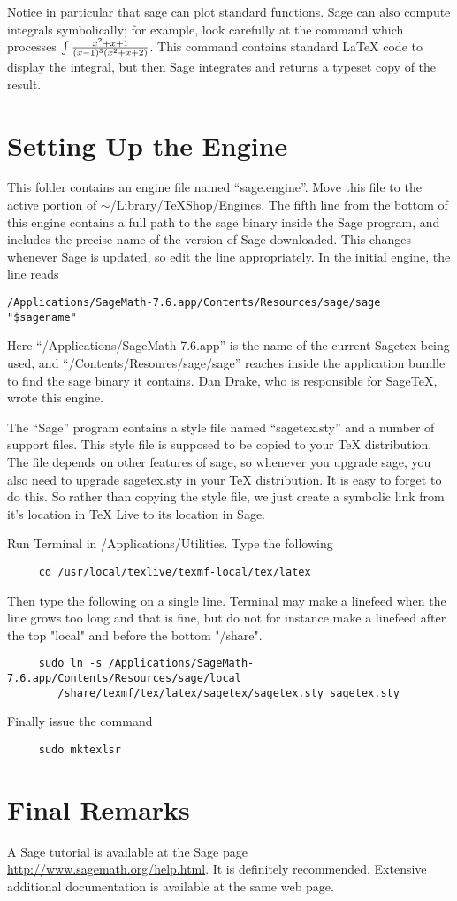 \documentclass[11pt, oneside]{amsart}
\begin{document}
Notice in particular that sage can plot standard functions. Sage can also compute integrals symbolically; for example, look carefully at the command which processes $\int {{x^2 + x + 1} \over {(x - 1)^3 (x^2 + x + 2)}}$. This command contains standard LaTeX code to display the integral, but then Sage integrates and returns a typeset copy of the result.


\section{Setting Up the Engine}

This folder contains an engine file named ``sage.engine''. Move this file to the active portion of $\sim$/Library/TeXShop/Engines.
 The fifth line from the bottom of this engine contains a full path to the sage binary inside the Sage program, and includes the precise name of the version of Sage downloaded. This changes whenever Sage is updated, so edit the line appropriately. In the initial engine, the line reads
\begin{verbatim}
/Applications/SageMath-7.6.app/Contents/Resources/sage/sage "$sagename"
\end{verbatim}
Here ``/Applications/SageMath-7.6.app'' is the name of the current Sagetex being
used, and ``/Contents/Resoures/sage/sage'' reaches inside the application bundle to find the
sage binary it contains.
Dan Drake, who is responsible for SageTeX, wrote this engine.

The ``Sage'' program contains a style file named ``sagetex.sty'' and a number of support files. This style file is supposed to be copied to your TeX distribution. The file depends on other features of sage, so whenever you upgrade sage, you also need to upgrade sagetex.sty in your TeX distribution. It is easy to forget to do this. So rather than copying the style file, we just
create a symbolic link from it's location in TeX Live to its location in Sage.

Run Terminal in /Applications/Utilities. Type the following
\begin{verbatim}
     cd /usr/local/texlive/texmf-local/tex/latex
\end{verbatim}
Then type the following on a single line. Terminal may make a linefeed when
the line  grows too long and that is fine, but do not for instance make a linefeed
after the top "local" and before the bottom "/share".
\begin{verbatim}
     sudo ln -s /Applications/SageMath-7.6.app/Contents/Resources/sage/local
        /share/texmf/tex/latex/sagetex/sagetex.sty sagetex.sty
\end{verbatim}

Finally issue the command
\begin{verbatim}		
     sudo mktexlsr
\end{verbatim}
	



\section{Final Remarks}
 
A Sage tutorial is available at the Sage page \url{http://www.sagemath.org/help.html}. It is definitely recommended. Extensive additional documentation is available at the same web page.
\end{document}
